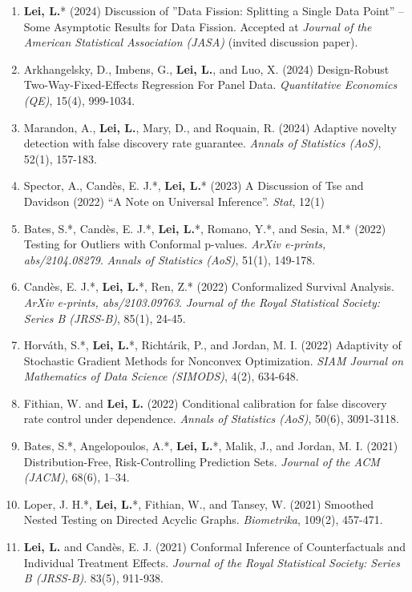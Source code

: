 \documentclass{article}
\newcommand{\red}[1]{{\color{red} #1}}
\begin{document}
\begin{enumerate}
\item \red{\textbf{Lei, L.}* (2024) Discussion of ”Data Fission: Splitting a Single Data Point” – Some Asymptotic Results for Data Fission. Accepted at \emph{Journal of the American Statistical Association (JASA)} (invited discussion paper).}
\item \red{Arkhangelsky, D., Imbens, G., \textbf{Lei, L.}, and Luo, X. (2024) Design-Robust Two-Way-Fixed-Effects Regression For Panel Data. \emph{Quantitative Economics (QE)}, 15(4), 999-1034.}
\item Marandon, A., \textbf{Lei, L.}, Mary, D., and Roquain, R. (2024) Adaptive novelty detection with false discovery rate guarantee. \emph{Annals of Statistics (AoS)}, 52(1), 157-183.
\item Spector, A., Cand\`{e}s, E. J.*, \textbf{Lei, L.}* (2023) A Discussion of Tse and Davidson (2022) “A Note on Universal Inference”. \emph{Stat}, 12(1)
\item Bates, S.*, Cand\`{e}s, E. J.*, \textbf{Lei, L.}*, Romano, Y.*, and Sesia, M.* (2022) Testing for Outliers with Conformal p-values. \emph{ArXiv e-prints, abs/2104.08279}. \emph{Annals of Statistics (AoS)}, 51(1), 149-178.  
\item Cand\`{e}s, E. J.*, \textbf{Lei, L.}*, Ren, Z.* (2022) Conformalized Survival Analysis. \emph{ArXiv e-prints, abs/2103.09763}. \emph{Journal of the Royal Statistical Society: Series B (JRSS-B)}, 85(1), 24-45.
\item Horv\'{a}th, S.*, \textbf{Lei, L.}*, Richt\'{a}rik, P., and Jordan, M. I. (2022) Adaptivity of Stochastic Gradient Methods for Nonconvex Optimization. \emph{SIAM Journal on Mathematics of Data Science (SIMODS)}, 4(2), 634-648.
\item Fithian, W. and \textbf{Lei, L.} (2022) Conditional calibration for false discovery rate control under dependence. \emph{Annals of Statistics (AoS)}, 50(6), 3091-3118.
\item Bates, S.*, Angelopoulos, A.*, \textbf{Lei, L.}*, Malik, J., and Jordan, M. I. (2021) Distribution-Free, Risk-Controlling Prediction Sets. \emph{Journal of the ACM (JACM)}, 68(6), 1–34.
\item Loper, J. H.*, \textbf{Lei, L.}*, Fithian, W., and Tansey, W. (2021) Smoothed Nested Testing on Directed Acyclic Graphs. \emph{Biometrika}, 109(2), 457-471.
\item \textbf{Lei, L.} and Cand\`{e}s, E. J. (2021) Conformal Inference of Counterfactuals and Individual Treatment Effects. \emph{Journal of the Royal Statistical Society: Series B (JRSS-B)}. 83(5), 911-938.

\end{enumerate}
\end{document}

